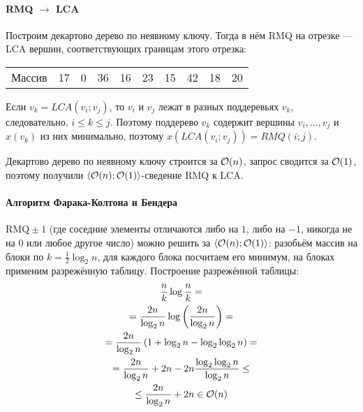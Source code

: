 \paragraph{RMQ $\to$ LCA}
Построим декартово дерево по неявному ключу.
Тогда в нём RMQ на отрезке --- LCA вершин,
соответствующих границам этого отрезка:

\begin{center}
    \begin{tabular}{r|ccccccccc|}
        Массив & 17 & 0 & 36 & 16 & 23 & 15 & 42 & 18 & 20 \\
    \end{tabular}

\end{center}

Если $v_k = LCA(v_i; v_j)$, то
$v_i$ и $v_j$ лежат в разных поддеревьях $v_k$,
следовательно, $i \leq k \leq j$.
Поэтому поддерево $v_k$ содержит вершины $v_i, \ldots, v_j$
и $x(v_k)$ из них минимально, поэтому
$x(LCA(v_i; v_j)) = RMQ(i; j)$.

Декартово дерево по неявному ключу строится за $\mathcal{O}(n)$,
запрос сводится за $\mathcal{O}(1)$,
поэтому получили $\langle \mathcal{O}(n); \mathcal{O}(1) \rangle$-сведение
RMQ к LCA.

\paragraph{Алгоритм Фарака-Колтона и Бендера}
$\text{RMQ}\pm 1$ (где соседние элементы отличаются
либо на $1$, либо на $-1$, никогда не на $0$ или любое другое число)
можно решить за $\langle \mathcal{O}(n); \mathcal{O}(1) \rangle$:
разобьём массив на блоки по $k = \frac{1}{2} \log_2 n$,
для каждого блока посчитаем его минимум, на блоках
применим разрежённую таблицу.
Построение разрежённой таблицы:
\begin{gather*}
    \frac{n}{k} \log \frac{n}{k} = \\
    = \frac{2n}{\log_2 n} \log \left( \frac{2n}{\log_2 n} \right) = \\
    = \frac{2n}{\log_2 n} \left( 1 + \log_2 n - \log_2 \log_2 n \right) = \\
    = \frac{2n}{\log_2 n} + 2n - 2n \frac{\log_2 \log_2 n}{\log_2 n} \leq \\
    \leq \frac{2n}{\log_2 n} + 2n \in \mathcal{O}(n)
\end{gather*}

